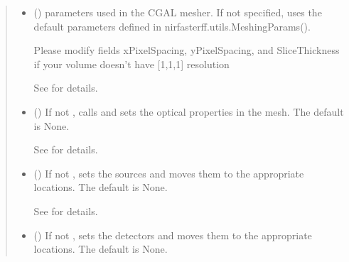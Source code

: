\documentclass[letterpaper,10pt,english]{sphinxmanual}
\begin{document}
\begin{fulllineitems}
\begin{fulllineitems}
\begin{quote}
\begin{description}
\begin{itemize}
\item {} 
\sphinxAtStartPar
{} ({\hyperref[\detokenize{_autosummary/nirfasterff.utils.MeshingParams:nirfasterff.utils.MeshingParams}]{}}\sphinxstyleliteralemphasis{\sphinxupquote{, }}) \textendash{} 
\sphinxAtStartPar
parameters used in the CGAL mesher. If not specified, uses the default parameters defined in nirfasterff.utils.MeshingParams().

\sphinxAtStartPar
Please modify fields xPixelSpacing, yPixelSpacing, and SliceThickness if your volume doesn’t have {[}1,1,1{]} resolution

\sphinxAtStartPar
See {\hyperref[\detokenize{_autosummary/nirfasterff.utils.MeshingParams:nirfasterff.utils.MeshingParams}]{}} for details.


\item {} 
\sphinxAtStartPar
{} (\sphinxstyleliteralemphasis{\sphinxupquote{, }}) \textendash{} 
\sphinxAtStartPar
If not , calls  and sets the optical properties in the mesh. The default is None.

\sphinxAtStartPar
See {\hyperref[\detokenize{_autosummary/nirfasterff.base.dcs_mesh.dcsmesh:nirfasterff.base.dcs_mesh.dcsmesh.set_prop}]{}} for details.


\item {} 
\sphinxAtStartPar
{} (\sphinxstyleliteralemphasis{\sphinxupquote{, }}) \textendash{} 
\sphinxAtStartPar
If not , sets the sources and moves them to the appropriate locations. The default is None.

\sphinxAtStartPar
See {\hyperref[\detokenize{_autosummary/nirfasterff.base.optodes.optode:nirfasterff.base.optodes.optode.touch_sources}]{}} for details.


\item {} 
\sphinxAtStartPar
{} (\sphinxstyleliteralemphasis{\sphinxupquote{, }}) \textendash{} 
\sphinxAtStartPar
If not , sets the detectors and moves them to the appropriate locations. The default is None.


\end{itemize}
\end{description}
\end{quote}
\end{fulllineitems}
\end{fulllineitems}
\end{document}
